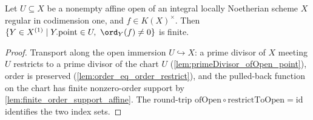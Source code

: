\begin{lemma}
  \label{lem:finite_order_support_on_affineOpen}
  Let \(U \subseteq X\) be a nonempty affine open of an integral locally
  Noetherian scheme \(X\) regular in codimension one, and \(f \in K(X)^{\times}\).
  Then \(\{Y \in X^{(1)} \mid Y.\mathrm{point} \in U,\ \ord_Y(f) \ne 0\}\) is finite.
\end{lemma}
\begin{proof}
  Transport along the open immersion \(U \hookrightarrow X\): a prime divisor of
  \(X\) meeting \(U\) restricts to a prime divisor of the chart \(U\)
  (\ref{lem:primeDivisor_ofOpen_point}), order is preserved
  (\ref{lem:order_eq_order_restrict}), and the pulled-back function on the chart
  has finite nonzero-order support by \ref{lem:finite_order_support_affine}.
  The round-trip \(\mathrm{ofOpen} \circ \mathrm{restrictToOpen} = \mathrm{id}\)
  identifies the two index sets.
\end{proof}

